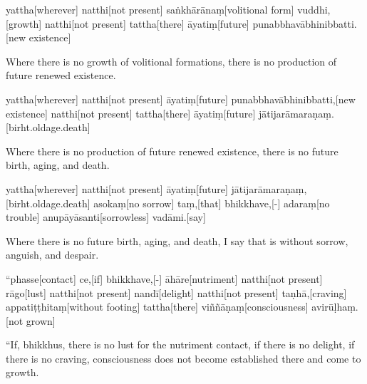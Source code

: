 \begin{samepage}
\begingl[glneveryline={\PaliGlossA,\PaliGlossB}]
yattha[wherever] natthi[not present] saṅkhārānaṃ[volitional form] vuddhi,[growth] natthi[not present] tattha[there] āyatiṃ[future] punabbhavābhinibbatti.[new existence]
\endgl
\nopagebreak
\linespread{0.5}
\begin{spacin}{0.2}
{\PaliGlossFT Where there is no growth of volitional formations, there is no production of future renewed existence.}
\end{spacin}
\vskip 12pt
\end{samepage}
\begin{samepage}
\begingl[glneveryline={\PaliGlossA,\PaliGlossB}]
yattha[wherever] natthi[not present] āyatiṃ[future] punabbhavābhinibbatti,[new existence] natthi[not present] tattha[there] āyatiṃ[future] jātijarāmaraṇaṃ.[birht.oldage.death]
\endgl
\nopagebreak
\linespread{0.5}
\begin{spacin}{0.2}
{\PaliGlossFT Where there is no production of future renewed existence, there is no future birth, aging, and death.}
\end{spacin}
\vskip 12pt
\end{samepage}
\begin{samepage}
\begingl[glneveryline={\PaliGlossA,\PaliGlossB}]
yattha[wherever] natthi[not present] āyatiṃ[future] jātijarāmaraṇaṃ,[birht.oldage.death] asokaṃ[no sorrow] taṃ,[that] bhikkhave,[-] adaraṃ[no trouble] anupāyāsanti[sorrowless] vadāmi.[say]
\endgl
\nopagebreak
\linespread{0.5}
\begin{spacin}{0.2}
{\PaliGlossFT Where there is no future birth, aging, and death, I say that is without sorrow, anguish, and despair.}
\end{spacin}
\vskip 12pt
\end{samepage}
\vskip 0.2in
\begin{samepage}
\begingl[glneveryline={\PaliGlossA,\PaliGlossB}]
“phasse[contact] ce,[if] bhikkhave,[-] āhāre[nutriment] natthi[not present] rāgo[lust] natthi[not present] nandī[delight] natthi[not present] taṇhā,[craving] appatiṭṭhitaṃ[without footing] tattha[there] viññāṇaṃ[consciousness] avirūḷhaṃ.[not grown]
\endgl
\nopagebreak
\linespread{0.5}
\begin{spacin}{0.2}
{\PaliGlossFT “If, bhikkhus, there is no lust for the nutriment contact, if there is no delight, if there is no craving, consciousness does not become established there and come to growth.}
\end{spacin}
\vskip 12pt
\end{samepage}
